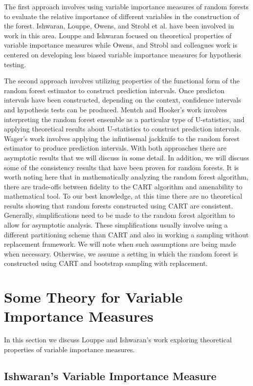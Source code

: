 \documentclass[12pt,twoside]{reedthesis}
\theoremstyle{definition}
\theoremstyle{definition}
\theoremstyle{definition}
\theoremstyle{remark}
\begin{document}
The first approach involves using variable importance measures of random
forests to evaluate the relative importance of different variables in
the construction of the forest. Ishwaran, Louppe, Owens, and Strobl et
al. have been involved in work in this area. Louppe and Ishwaran focused
on theoretical properties of variable importance measures while Owens,
and Strobl and colleagues work is centered on developing less biased
variable importance measures for hypothesis testing.

The second approach involves utilizing properties of the functional form
of the random forest estimator to construct prediction intervals. Once
predicton intervals have been constructed, depending on the context,
confidence intervals and hypothesis tests can be produced. Mentch and
Hooker's work involves interpreting the random forest ensemble as a
particular type of U-statistics, and applying theoretical results about
U-statistics to construct prediction intervals. Wager's work involves
applying the infintisemal jackknife to the random forest estimator to
produce prediction intervals. With both approaches there are asymptotic
results that we will discuss in some detail. In addition, we will
discuss some of the consistency results that have been proven for random
forests. It is worth noting here that in mathematically analyzing the
random forest algorithm, there are trade-offs between fidelity to the
CART algorithm and amenability to mathematical tool. To our best
knowledge, at this time there are no theoretical results showing that
random forests constructed using CART are consistent. Generally,
simplifications need to be made to the random forest algorithm to allow
for asymptotic analysis. These simplifications usually involve using a
different partitioning scheme than CART and also in working a sampling
without replacement framework. We will note when such assumptions are
being made when necessary. Otherwise, we assume a setting in which the
random forest is constructed using CART and bootstrap sampling with
replacement.

\section{Some Theory for Variable Importance
Measures}\label{some-theory-for-variable-importance-measures}

In this section we discuss Louppe and Ishwaran's work exploring
theoretical properties of variable importance measures.

\subsection{Ishwaran's Variable Importance
Measure}\label{ishwarans-variable-importance-measure}
\end{document}
